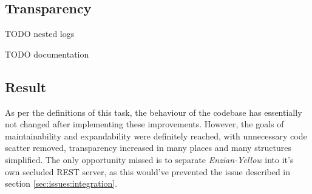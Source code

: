 \subsection{Transparency}
\label{sec:impr:enzian:log}

TODO nested logs

TODO documentation

\subsection{Result}
\label{sec:impr:enzian:result}

As per the definitions of this task, the behaviour of the codebase has essentially not changed after implementing these improvements. However, the goals of maintainability and expandability were definitely reached, with unnecessary code scatter removed, transparency increased in many places and many structures simplified. \newline
The only opportunity missed is to separate \emph{Enzian-Yellow} into it's own secluded REST server, as this would've prevented the issue described in section \ref{sec:issues:integration}.